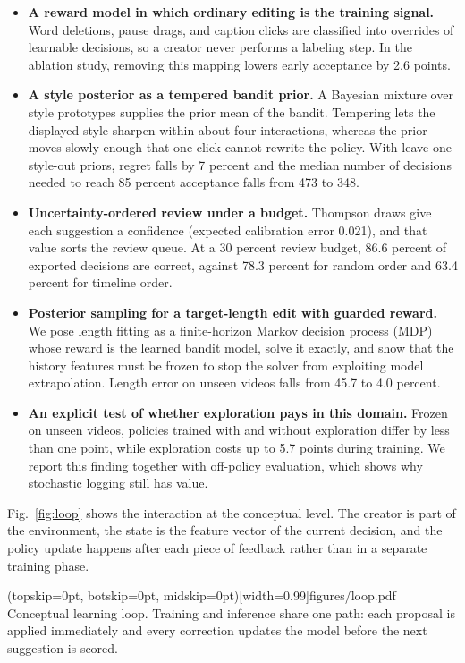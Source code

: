 \documentclass{ieeeaccess}
\begin{document}
\begin{itemize}
\item \textbf{A reward model in which ordinary editing is the training signal.} Word deletions, pause drags, and caption clicks are classified into overrides of learnable decisions, so a creator never performs a labeling step. In the ablation study, removing this mapping lowers early acceptance by 2.6 points.
\item \textbf{A style posterior as a tempered bandit prior.} A Bayesian mixture over style prototypes supplies the prior mean of the bandit. Tempering lets the displayed style sharpen within about four interactions, whereas the prior moves slowly enough that one click cannot rewrite the policy. With leave-one-style-out priors, regret falls by 7 percent and the median number of decisions needed to reach 85 percent acceptance falls from 473 to 348.
\item \textbf{Uncertainty-ordered review under a budget.} Thompson draws give each suggestion a confidence (expected calibration error 0.021), and that value sorts the review queue. At a 30 percent review budget, 86.6 percent of exported decisions are correct, against 78.3 percent for random order and 63.4 percent for timeline order.
\item \textbf{Posterior sampling for a target-length edit with guarded reward.} We pose length fitting as a finite-horizon Markov decision process (MDP) whose reward is the learned bandit model, solve it exactly, and show that the history features must be frozen to stop the solver from exploiting model extrapolation. Length error on unseen videos falls from 45.7 to 4.0 percent.
\item \textbf{An explicit test of whether exploration pays in this domain.} Frozen on unseen videos, policies trained with and without exploration differ by less than one point, while exploration costs up to 5.7 points during training. We report this finding together with off-policy evaluation, which shows why stochastic logging still has value.
\end{itemize}

Fig.~\ref{fig:loop} shows the interaction at the conceptual level. The creator is part of the environment, the state is the feature vector of the current decision, and the policy update happens after each piece of feedback rather than in a separate training phase.

\Figure[t!](topskip=0pt, botskip=0pt, midskip=0pt)[width=0.99\columnwidth]{figures/loop.pdf}
{Conceptual learning loop. Training and inference share one path: each proposal is applied immediately and every correction updates the model before the next suggestion is scored.\label{fig:loop}}
\end{document}
